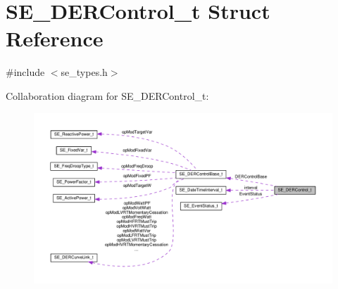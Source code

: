 \hypertarget{structSE__DERControl__t}{}\section{S\+E\+\_\+\+D\+E\+R\+Control\+\_\+t Struct Reference}
\label{structSE__DERControl__t}


{\ttfamily \#include $<$se\+\_\+types.\+h$>$}



Collaboration diagram for S\+E\+\_\+\+D\+E\+R\+Control\+\_\+t\+:\nopagebreak
\begin{figure}[H]
\begin{center}
\leavevmode
\includegraphics[width=350pt]{structSE__DERControl__t__coll__graph}
\end{center}
\end{figure}
